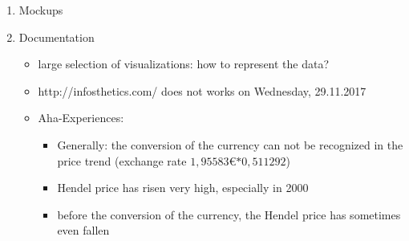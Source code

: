 \documentclass[11pt, twoside, BCOR=8mm, DIV=12]{scrartcl}
\begin{document}
\begin{enumerate}[label=\alph*)]
\item Mockups
\item Documentation
\begin{itemize}
    \item large selection of visualizations: how to represent the data?
    \item http://infosthetics.com/ does not works on Wednesday, 29.11.2017
    \item Aha-Experiences: 
    \begin{itemize}
    	\item Generally: the conversion of the currency can not be recognized in the price trend (exchange rate $ 1,95583$\euro $* 0,511292 $)
        \item Hendel price has risen very high, especially in 2000
        \item before the conversion of the currency, the Hendel price has sometimes even fallen
    \end{itemize}
\end{itemize}
\end{enumerate}
\end{document}
